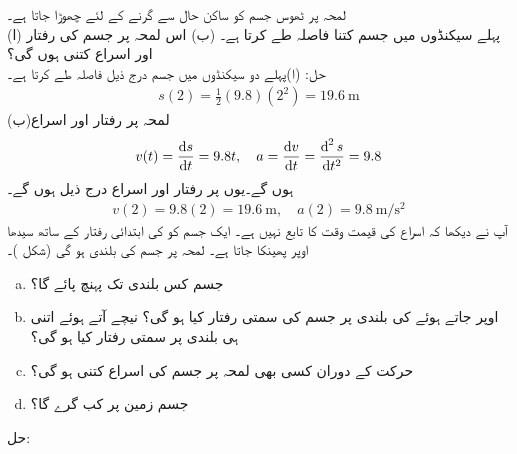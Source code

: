 لمحہ  پر  ٹھوس جسم کو ساکن حال سے گرنے کے لئے چھوڑا جاتا ہے۔\\
(ا) پہلے  سیکنڈوں میں جسم کتنا فاصلہ طے کرتا ہے۔ (ب) اس لمحہ پر جسم کی رفتار اور اسراع کتنی ہوں گی؟\\
حل:\quad
(ا)\quad پہلے دو سیکنڈوں میں جسم درج ذیل فاصلہ طے کرتا ہے۔
\begin{align*}
s(2)=\frac{1}{2}(9.8)(2^2)=\SI{19.6}{\meter}
\end{align*}
(ب)\quad لمحہ  پر رفتار  اور اسراع  
\begin{align*}
v(t)=\frac{\dif s}{\dif t}=9.8 t,\quad a=\frac{\dif v}{\dif t}=\frac{\dif^{\,2}s}{\dif t^2}=9.8
\end{align*}
ہوں گے۔یوں  پر رفتار اور اسراع درج ذیل ہوں گے۔
\begin{align*}
v(2)=9.8(2)=\SI{19.6}{\meter},\quad a(2)=\SI{9.8}{\meter\per\second\squared}
\end{align*}
آپ نے دیکھا کہ اسراع  کی قیمت وقت  کا تابع نہیں ہے۔
ایک جسم کو  کی ابتدائی رفتار کے ساتھ سیدھا اوپر پھینکا جاتا ہے۔ لمحہ  پر جسم  کی بلندی   ہو گی (شکل )۔\\
\begin{enumerate}[a.]
\item
جسم کس بلندی تک پہنچ پائے گا؟
\item
اوپر جاتے ہوئے  کی بلندی پر جسم کی سمتی رفتار کیا ہو گی؟ نیچے آتے ہوئے اتنی ہی بلندی پر سمتی رفتار کیا ہو گی؟
\item
حرکت کے دوران کسی بھی لمحہ  پر جسم کی اسراع کتنی ہو گی؟ 
\item
جسم زمین پر کب گرے گا؟
\end{enumerate}
حل:
